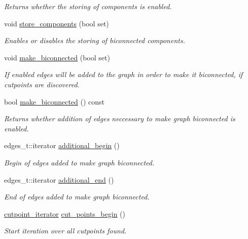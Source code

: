 \begin{DoxyCompactItemize}
\begin{DoxyCompactList}\small\item\em Returns whether the storing of components is enabled. \end{DoxyCompactList}\item 
void \mbox{\hyperlink{classbiconnectivity_ab7c9e256a4d7a4ffea33b20f014e1f69}{store\+\_\+components}} (bool set)
\begin{DoxyCompactList}\small\item\em Enables or disables the storing of biconnected components. \end{DoxyCompactList}\item 
void \mbox{\hyperlink{classbiconnectivity_a774fd08203a6d164605afc4cdc8b9201}{make\+\_\+biconnected}} (bool set)
\begin{DoxyCompactList}\small\item\em If enabled edges will be added to the graph in order to make it biconnected, if cutpoints are discovered. \end{DoxyCompactList}\item 
bool \mbox{\hyperlink{classbiconnectivity_a9ca9632a7fc398edb5b505dd0fe706c9}{make\+\_\+biconnected}} () const
\begin{DoxyCompactList}\small\item\em Returns whether addition of edges neccessary to make graph biconnected is enabled. \end{DoxyCompactList}\item 
edges\+\_\+t\+::iterator \mbox{\hyperlink{classbiconnectivity_a9560cdde8a90c12760b9930c494be410}{additional\+\_\+begin}} ()
\begin{DoxyCompactList}\small\item\em Begin of edges added to make graph biconnected. \end{DoxyCompactList}\item 
edges\+\_\+t\+::iterator \mbox{\hyperlink{classbiconnectivity_a801847685ebf2b5727743cd21401e88c}{additional\+\_\+end}} ()
\begin{DoxyCompactList}\small\item\em End of edges added to make graph biconnected. \end{DoxyCompactList}\item 
\mbox{\hyperlink{classbiconnectivity_ac9063160d59ab0ea4fa924a68395700b}{cutpoint\+\_\+iterator}} \mbox{\hyperlink{classbiconnectivity_a473197552874aaf148e847838144eed7}{cut\+\_\+points\+\_\+begin}} ()
\begin{DoxyCompactList}\small\item\em Start iteration over all cutpoints found. \end{DoxyCompactList}\item 

\end{DoxyCompactItemize}
